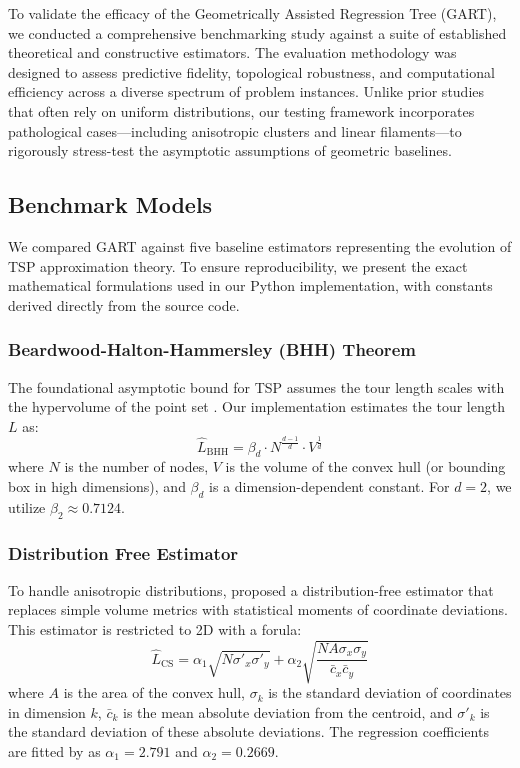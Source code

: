 \documentclass{article}
\begin{document}
To validate the efficacy of the Geometrically Assisted Regression Tree (GART), we conducted a comprehensive benchmarking study against a suite of established theoretical and constructive estimators. The evaluation methodology was designed to assess predictive fidelity, topological robustness, and computational efficiency across a diverse spectrum of problem instances. Unlike prior studies that often rely on uniform distributions, our testing framework incorporates pathological cases—including anisotropic clusters and linear filaments—to rigorously stress-test the asymptotic assumptions of geometric baselines.

\subsection{Benchmark Models}

We compared GART against five baseline estimators representing the evolution of TSP approximation theory. To ensure reproducibility, we present the exact mathematical formulations used in our Python implementation, with constants derived directly from the source code.

\subsubsection{Beardwood-Halton-Hammersley (BHH) Theorem}
The foundational asymptotic bound for TSP assumes the tour length scales with the hypervolume of the point set \citep{bhh1959}. Our implementation estimates the tour length $L$ as:
\begin{equation}
    \hat{L}_{\text{BHH}} = \beta_d \cdot N^{\frac{d-1}{d}} \cdot V^{\frac{1}{d}}
\end{equation}
where $N$ is the number of nodes, $V$ is the volume of the convex hull (or bounding box in high dimensions), and $\beta_d$ is a dimension-dependent constant. For $d=2$, we utilize $\beta_2 \approx 0.7124$.

\subsubsection{Distribution Free Estimator }
To handle anisotropic distributions, \citet{cavdar2015distribution} proposed a distribution-free estimator that replaces simple volume metrics with statistical moments of coordinate deviations. This estimator is restricted to 2D with a forula:
\begin{equation}
    \hat{L}_{\text{CS}} = \alpha_1 \sqrt{N \sigma'_x \sigma'_y} + \alpha_2 \sqrt{\frac{N A \sigma_x \sigma_y}{\bar{c}_x \bar{c}_y}}
\end{equation}
where $A$ is the area of the convex hull, $\sigma_k$ is the standard deviation of coordinates in dimension $k$, $\bar{c}_k$ is the mean absolute deviation from the centroid, and $\sigma'_k$ is the standard deviation of these absolute deviations. The regression coefficients are fitted by \citet{cavdar2015distribution} as $\alpha_1 = 2.791$ and $\alpha_2 = 0.2669$.
\end{document}
